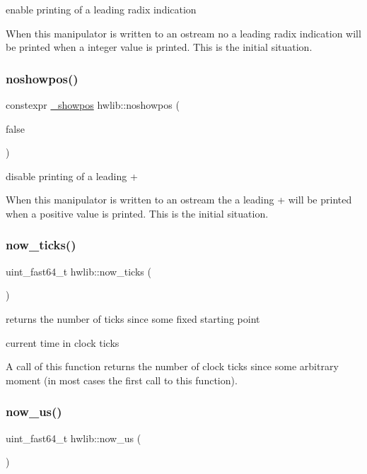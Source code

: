 enable printing of a leading radix indication

When this manipulator is written to an ostream no a leading radix indication will be printed when a integer value is printed. This is the initial situation. \mbox{\label{namespacehwlib_accdd72e1358d667a9458767d886b2a53}} 
\subsubsection{\texorpdfstring{noshowpos()}{noshowpos()}}
{\footnotesize\ttfamily constexpr \hyperlink{structhwlib_1_1__showpos}{\+\_\+showpos} hwlib\+::noshowpos (\begin{DoxyParamCaption}\item[{false}]{ }\end{DoxyParamCaption})}

disable printing of a leading \textquotesingle{}+\textquotesingle{}

When this manipulator is written to an ostream the a leading \textquotesingle{}+\textquotesingle{} will be printed when a positive value is printed. This is the initial situation. \mbox{\label{namespacehwlib_a004512830e68d72d8fd0e3153895e65b}} 
\subsubsection{\texorpdfstring{now\+\_\+ticks()}{now\_ticks()}}
{\footnotesize\ttfamily uint\+\_\+fast64\+\_\+t hwlib\+::now\+\_\+ticks (\begin{DoxyParamCaption}{ }\end{DoxyParamCaption})}



returns the number of ticks since some fixed starting point 

current time in clock ticks

A call of this function returns the number of clock ticks since some arbitrary moment (in most cases the first call to this function). \mbox{\label{namespacehwlib_a27573ff04679de98f9325a8d9cff7a14}} 
\subsubsection{\texorpdfstring{now\+\_\+us()}{now\_us()}}
{\footnotesize\ttfamily uint\+\_\+fast64\+\_\+t hwlib\+::now\+\_\+us (\begin{DoxyParamCaption}{ }\end{DoxyParamCaption})}



